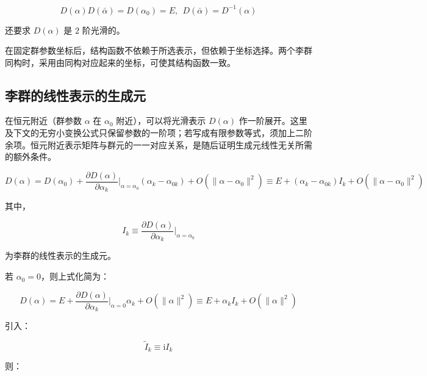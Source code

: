 \begin{equation}
D\left(\alpha\right)D\left(\bar{\alpha}\right)
=D\left(\alpha_0\right)
=E,~~
D\left(\bar{\alpha}\right)
=D^{-1}\left(\alpha\right)
\end{equation}

还要求 $D\left(\alpha\right)$ 是 $2$ 阶光滑的。

在固定群参数坐标后，结构函数不依赖于所选表示，但依赖于坐标选择。两个李群同构时，采用由同构对应起来的坐标，可使其结构函数一致。

\subsection{李群的线性表示的生成元}

在恒元附近（群参数 $\alpha$ 在 $\alpha_0$ 附近），可以将光滑表示 $D\left(\alpha\right)$ 作一阶展开。这里及下文的无穷小变换公式只保留参数的一阶项；若写成有限参数等式，须加上二阶余项。恒元附近表示矩阵与群元的一一对应关系，是随后证明生成元线性无关所需的额外条件。

\begin{equation}
D\left(\alpha\right)
=D\left(\alpha_0\right) + \frac{\partial D\left(\alpha\right) }{\partial \alpha_k }\bigg|_{\alpha=\alpha_0} \left(\alpha_k-\alpha_{0k}\right)+O\left(\lVert\alpha-\alpha_0\rVert^2\right)
\equiv E + \left(\alpha_k-\alpha_{0k}\right) I_k+O\left(\lVert\alpha-\alpha_0\rVert^2\right)
\end{equation}

其中，

\begin{equation}
I_k
\equiv \frac{\partial D\left(\alpha\right) }{\partial \alpha_k }\bigg|_{\alpha=\alpha_0}
\end{equation}

为李群的线性表示的生成元。

若 $\alpha_0=0$，则上式化简为：

\begin{equation}
D\left(\alpha\right)
=E + \frac{\partial D\left(\alpha\right) }{\partial \alpha_k }\bigg|_{\alpha=0} \alpha_k+O\left(\lVert\alpha\rVert^2\right) 
\equiv E + \alpha_k I_k+O\left(\lVert\alpha\rVert^2\right)
\end{equation}

引入：

\begin{equation}
\tilde{I}_k
\equiv \mathrm{i} I_k
\end{equation}

则：

